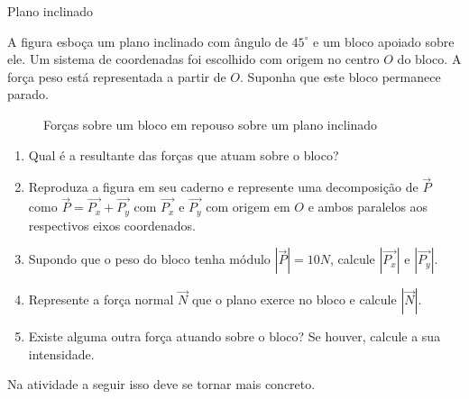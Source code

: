 \begin{task}{ Plano inclinado}
\label{ativ-vetores-plano-inclinado}



A figura esboça um plano inclinado com ângulo de \(45^{\circ}\) e um bloco apoiado sobre ele. Um sistema de coordenadas foi escolhido com origem no centro \(O\) do bloco. A força peso está representada a partir de \(O\). Suponha que este bloco permanece parado.
\begin{figure}[H]\centering{}\caption{Forças sobre um bloco em repouso sobre um plano inclinado}\end{figure}\begin{enumerate}
\item {} 
Qual é a resultante das forças que atuam sobre o bloco?

\item {} 
Reproduza a figura em seu caderno e represente uma decomposição de \(\vec{P}\) como \(\vec{P } = \vec{P_x} + \vec{P_y}\) com \(\vec{P_x}\) e \(\vec{P_y}\) com origem em \(O\) e ambos paralelos aos respectivos eixos coordenados.

\item {} 
Supondo que o peso do bloco tenha módulo \(|\vec{P}|=10 N\), calcule \(|\vec{P_x}|\) e \(|\vec{P_y}|\).

\item {} 
Represente a força normal \(\vec{N}\) que o plano exerce no bloco e calcule \(|\vec{N}|\).

\item {} 
Existe alguma outra força atuando sobre o bloco? Se houver, calcule a sua intensidade.

\end{enumerate}
\end{task}




\know{}


Na atividade a seguir isso deve se tornar mais concreto.


